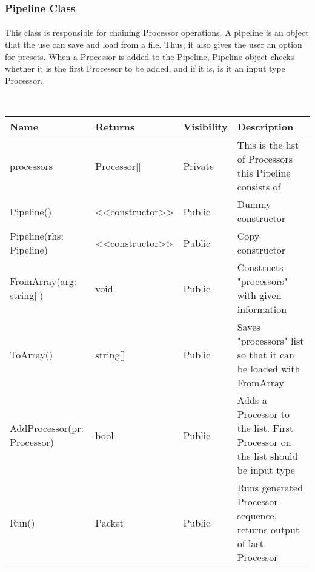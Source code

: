 \skipsubsection

\subsubsection{Pipeline Class}
\paragraph{}
\normalsize
This class is responsible for chaining Processor operations. A pipeline is an object that the use can save and load from a file. Thus, it also gives the user an option for presets. When a Processor is added to the Pipeline, Pipeline object checks whether it is the first Processor to be added, and if it is, is it an input type Processor.\\

\begin{center}
	\\[0.8cm]
	\begin{tabular}{|p{4cm}|p{2.2cm}|p{1.8cm}|p{6cm}|}
		\hline 
			Name & Returns & Visibility & Description \\
		\hline 
			processors & Processor[] & Private & This is the list of Processors this Pipeline consists of \\
		\hline 
			Pipeline() & <<constructor>> & Public & Dummy constructor \\
		\hline 
			Pipeline(rhs: Pipeline) & <<constructor>> & Public & Copy constructor \\
		\hline
			FromArray(arg: string[]) & void & Public & Constructs "processors" with given information \\
		\hline
			ToArray() & string[] & Public & Saves "processors" list so that it can be loaded with FromArray\\
		\hline
			AddProcessor(pr: Processor) & bool & Public & Adds a Processor to the list. First Processor on the list should be input type \\
		\hline
			Run() & Packet & Public & Runs generated Processor sequence, returns output of last Processor\\
		\hline
	\end{tabular}
\end{center}

